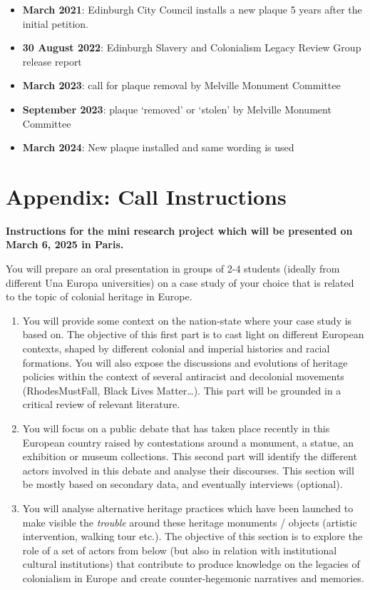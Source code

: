 \documentclass{scrartcl}
\renewcommand{\cite}{\parencite}
\begin{document}
\begin{appendices}
\begin{itemize}
    \item \textbf{March 2021}: Edinburgh City Council  installs a new plaque  \cite{mccarthy_2022_1,anderson_2021} 5 years after the initial petition.
    \item \textbf{30 August 2022}: Edinburgh Slavery and Colonialism Legacy Review Group release report
    \item \textbf{March 2023}: call for plaque removal by Melville Monument Committee \cite{bbc_2023_1}
    \item \textbf{September 2023}: plaque `removed' or `stolen' by Melville Monument Committee \cite{bbc_2023_2,bbc_2024}
    \item \textbf{March 2024}: New plaque installed and same wording is used \cite{bbc_2024, coec_2024} 
\end{itemize}

\section{Appendix: Call Instructions}
\textbf{Instructions for the mini research project which will be presented on March 6, 2025 in Paris.}

You will prepare an oral presentation in groups of 2-4 students (ideally from different Una Europa universities) on a case study of your choice that is related to the topic of colonial heritage in Europe. 



\begin{enumerate}
    \item You will provide some context on the nation-state where your case study is based on. The objective of this first part is to cast light on different European contexts, shaped by different colonial and imperial histories and racial formations. You will also expose the discussions and evolutions of heritage policies within the context of several antiracist and decolonial movements (RhodesMustFall, Black Lives Matter…). This part will be grounded in a critical review of relevant literature.
    \item You will focus on a public debate that has taken place recently in this European country raised by contestations around a monument, a statue, an exhibition or museum collections. This second part will identify the different actors involved in this debate and analyse their discourses. This section will be mostly based on secondary data, and eventually interviews (optional).
    \item  You will analyse alternative heritage practices which have been launched to make visible the \textit{trouble} around these heritage monuments / objects (artistic intervention, walking tour etc.). The objective of this section is to explore the role of a set of actors from below (but also in relation with institutional cultural institutions) that contribute to produce knowledge on the legacies of colonialism in Europe and create counter-hegemonic narratives and memories. 
\end{enumerate}


\end{appendices}
\end{document}
